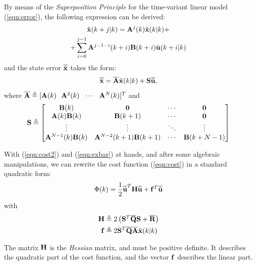 \documentclass[twocolumn]{IEEEtran} %
\begin{document}
By means of the {\em Superposition Principle} for the time-variant linear model (\ref{eqn:error}), the following expression can be derived:
\begin{multline*}
	\tilde{\bf x}(k+j|k) = {\bf A}^j(k)\tilde{\bf x}(k|k) + \\ + \sum_{i=0}^{j-1}{\bf A}^{j-1-i}(k+i){\bf B}(k+i)\tilde{\bf u}(k+i|k)
\end{multline*}
and the state error $\overline{\tilde{\bf x}}$ takes the form:
\begin{equation}\label{eqn:exbar}
	\overline{\tilde{\bf x}}=\overline{\bf A}\tilde{\bf x}(k|k)+{\bf S}\overline{\tilde{\bf u}},
\end{equation}
where $\overline{\bf A} \triangleq [{\bf A}(k)~~{\bf A}^2(k)~~\cdots~~{\bf A}^N(k)]^T$ and
{\small
	\begin{equation*}
		{\bf S} \triangleq \begin{bmatrix}
			{\bf B}(k)                 & {\bf 0} 					& \cdots & {\bf 0}       \\
			{\bf A}(k){\bf B}(k)       & {\bf B}(k+1)      			& \cdots & {\bf 0}       \\
			\vdots	                 & \vdots		     		& \ddots & \vdots        \\
			{\bf A}^{N-1}(k){\bf B}(k) & {\bf A}^{N-2}(k+1){\bf B}(k+1) & \cdots & {\bf B}(k+N-1)
		\end{bmatrix}
	\end{equation*}
}

With (\ref{eqn:cost2}) and (\ref{eqn:exbar}) at hands, and after some algebraic manipulations, we can rewrite the cost function (\ref{eqn:cost}) in a standard quadratic form:
\begin{equation}
	\Phi(k) = \frac{1}{2}\overline{\tilde{\bf u}}^T{\bf H}\overline{\tilde{\bf u}} + {\bf f}^T\overline{\tilde{\bf u}}
\end{equation}
with
\begin{align*}
	{\bf H} &\triangleq 2\left({\bf S}^T\overline{\bf Q}{\bf S}+\overline{\bf R}\right) \\
	{\bf f} &\triangleq 2{\bf S}^T\overline{\bf Q}\overline{\bf A}\tilde{\bf x}(k|k)
\end{align*}

The matrix ${\bf H}$ is the {\em Hessian} matrix, and must be positive definite. It describes the quadratic part of the cost function, and the vector ${\bf f}$ describes the linear part. 
\end{document}
